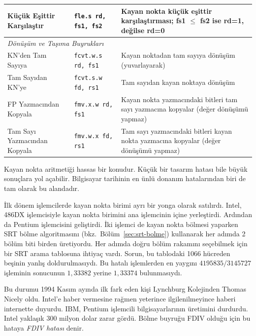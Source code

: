 \begin{table}[htbp]
\begin{tabularx}{\textwidth}{l l X}
Küçük Eşittir Karşılaştır & \texttt{fle.s rd, fs1, fs2} & Kayan nokta küçük eşittir karşılaştırması; fs1 $\leq$ fs2 ise rd=1, değilse rd=0 \\
\midrule
\multicolumn{3}{l}{\textit{Dönüşüm ve Taşıma Buyrukları}} \\
\midrule
KN'den Tam Sayıya & \texttt{fcvt.w.s rd, fs1} & Kayan noktadan tam sayıya dönüşüm (yuvarlayarak) \\
Tam Sayıdan KN'ye & \texttt{fcvt.s.w fd, rs1} & Tam sayıdan kayan noktaya dönüşüm \\
FP Yazmacından Kopyala & \texttt{fmv.x.w rd, fs1} & Kayan nokta yazmacındaki bitleri tam sayı yazmacına kopyalar (değer dönüşümü yapmaz) \\
Tam Sayı Yazmacından Kopyala & \texttt{fmv.w.x fd, rs1} & Tam sayı yazmacındaki bitleri kayan nokta yazmacına kopyalar (değer dönüşümü yapmaz) \\
\bottomrule
\end{tabularx}
\end{table}


\FloatBarrier
\begin{bilginot}
\label{sec:fdiv-hatasi}
Kayan nokta aritmetiği hassas bir konudur. Küçük bir tasarım hatası bile büyük sonuçlara yol açabilir. Bilgisayar tarihinin en ünlü donanım hatalarından biri de tam olarak bu alandadır.

İlk dönem işlemcilerde kayan nokta birimi ayrı bir yonga olarak satılırdı. Intel, 486DX işlemcisiyle kayan nokta birimini ana işlemcinin içine yerleştirdi. Ardından da Pentium işlemcisini geliştirdi. İki işlemci de kayan nokta bölmesi yaparken SRT bölme algoritmasını (bkz.~Bölüm~\ref{sec:srt-bolme}) kullanarak her adımda 2 bölüm biti birden üretiyordu. Her adımda doğru bölüm rakamını seçebilmek için bir SRT arama tablosuna ihtiyaç vardı. Sorun, bu tablodaki 1066 hücreden beşinin yanlış doldurulmasıydı. Bu hatalı işlemlerden en yaygını $4195835 / 3145727$ işleminin sonucunun $1{,}33382$ yerine $1{,}33374$ bulunmasıydı.

Bu durumu 1994 Kasım ayında ilk fark eden kişi Lynchburg Kolejinden Thomas Nicely oldu. Intel'e haber vermesine rağmen yeterince ilgilenilmeyince haberi internette duyurdu. IBM, Pentium işlemcili bilgisayarlarının üretimini durdurdu. Intel yaklaşık 300 milyon dolar zarar gördü. Bölme buyruğu FDIV olduğu için bu hataya \emph{FDIV hatası} denir.
\end{bilginot}

